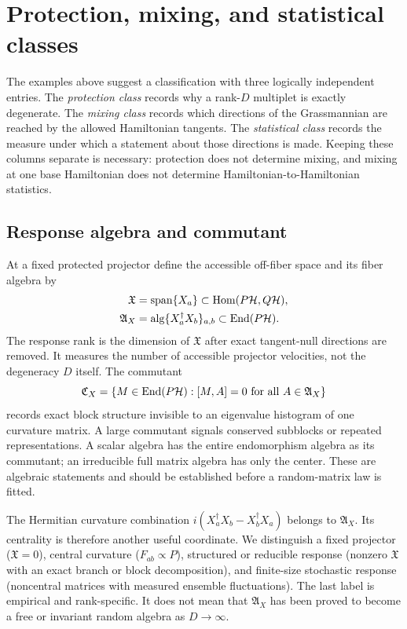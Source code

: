 \section{Protection, mixing, and statistical classes}
\label{sec:classification}

The examples above suggest a classification with three logically independent
entries.  The \emph{protection class} records why a rank-$D$ multiplet is
exactly degenerate.  The \emph{mixing class} records which directions of the
Grassmannian are reached by the allowed Hamiltonian tangents.  The
\emph{statistical class} records the measure under which a statement about
those directions is made.  Keeping these columns separate is necessary:
protection does not determine mixing, and mixing at one base Hamiltonian does
not determine Hamiltonian-to-Hamiltonian statistics.

\subsection{Response algebra and commutant}

At a fixed protected projector define the accessible off-fiber space and its
fiber algebra by
\begin{align}
 \mathfrak X
 &=\operatorname{span}\{X_a\}
   \subset\operatorname{Hom}(P\mathcal H,Q\mathcal H),
 \nonumber\\
 \mathfrak A_X
 &=\operatorname{alg}\{X_a^\dagger X_b\}_{a,b}
   \subset\operatorname{End}(P\mathcal H).
 \label{eq:response-algebra}
\end{align}
The response rank is the dimension of $\mathfrak X$ after exact tangent-null
directions are removed.  It measures the number of accessible projector
velocities, not the degeneracy $D$ itself.  The commutant
\begin{equation}
 \mathfrak C_X=\{M\in\operatorname{End}(P\mathcal H):
 [M,A]=0\ \text{for all }A\in\mathfrak A_X\}
 \label{eq:response-commutant}
\end{equation}
records exact block structure invisible to an eigenvalue histogram of one
curvature matrix.  A large commutant signals conserved subblocks or repeated
representations.  A scalar algebra has the entire endomorphism algebra as its
commutant; an irreducible full matrix algebra has only the center.  These are
algebraic statements and should be established before a random-matrix law is
fitted.

The Hermitian curvature combination
$i(X_a^\dagger X_b-X_b^\dagger X_a)$ belongs to $\mathfrak A_X$.  Its
centrality is therefore another useful coordinate.  We distinguish a fixed projector ($\mathfrak X=0$), central
curvature ($F_{ab}\propto P$), structured or reducible response (nonzero
$\mathfrak X$ with an exact branch or block decomposition), and finite-size
stochastic response (noncentral matrices with measured ensemble
fluctuations).  The last label is empirical and rank-specific.  It does not
mean that $\mathfrak A_X$ has been proved to become a free or invariant random
algebra as $D\rightarrow\infty$.


